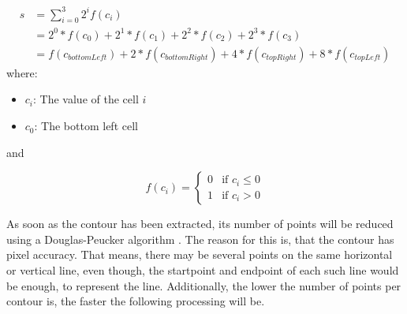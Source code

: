 \newenvironment{conditions}
  {\par\vspace{\abovedisplayskip}\noindent\begin{tabular}{>{$}l<{$} @{${}={}$} l}}
  {\end{tabular}\par\vspace{\belowdisplayskip}}

\begin{equation}
\begin{split}
	s	&= \displaystyle\sum_{i=0}^3 2^i f(c_i) \\
		&= 2^0 * f(c_0) + 2^1 * f(c_1) + 2^2 * f(c_2) + 2^3 * f(c_3) \\
		&= f(c_{bottomLeft}) + 2 * f(c_{bottomRight}) + 4 * f(c_{topRight}) + 8 * f(c_{topLeft})
	\label{equ:challenges:marching_squares_state}
\end{split}
\end{equation}
where:
\begin{itemize}[label=]
    \item $c_i$: The value of the cell $i$
    \item $c_0$: The bottom left cell
\end{itemize}

and

\[ f(c_i) =
  \begin{cases}
    0  & \text{if $c_i \leq 0$}\\
    1  & \text{if $c_i > 0$}
  \end{cases}
\]


As soon as the contour has been extracted, its number of points will be reduced using a Douglas-Peucker algorithm \cite{Douglas.1973}. The reason for this is, that the contour has pixel accuracy. That means, there may be several points on the same horizontal or vertical line, even though, the startpoint and endpoint of each such line would be enough, to represent the line. Additionally, the lower the number of points per contour is, the faster the following processing will be.

